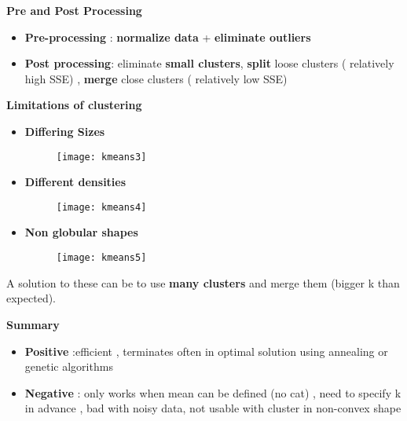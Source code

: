 \begin{description}
\item{\textbf{Pre and Post Processing}}
\begin{itemize}
\item \textbf{Pre-processing} : \textbf{normalize data} + \textbf{eliminate outliers}
\item \textbf{Post processing}: eliminate \textbf{small clusters}, \textbf{split} loose clusters ( relatively high SSE) , \textbf{merge} close clusters ( relatively low SSE)
\end{itemize}

\item{\textbf{Limitations of clustering}}\\
\begin{itemize}
\item \textbf{Differing Sizes}
 \begin{figure}[H]
  \centering
  \texttt{[image: kmeans3]}
\end{figure}
\item \textbf{Different densities}
\begin{figure}[H]
  \centering
  \texttt{[image: kmeans4]}
\end{figure}

\item \textbf{Non globular shapes}
\begin{figure}[H]
  \centering
  \texttt{[image: kmeans5]}
\end{figure}
\end{itemize}
A solution to these can be to use \textbf{many clusters} and merge them (bigger k than expected).

\item \textbf{Summary}\\
\begin{itemize}
\item \textbf{Positive} :efficient , terminates often in optimal solution using annealing or genetic algorithms
\item \textbf{Negative} : only works when mean can be defined (no cat) , need to specify k in advance , bad with noisy data, not usable with cluster in non-convex shape
\end{itemize}
\end{description}

